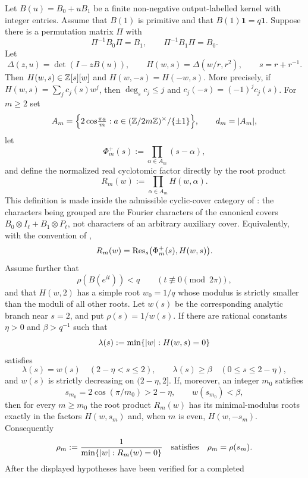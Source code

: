 \begin{theorem}
  \label{thm:self-dual-endpoint-selection}

  Let \(B(u)=B_0+uB_1\) be a finite non-negative output-labelled kernel
  with integer entries. Assume that \(B(1)\) is primitive and that
  \(B(1)\mathbf 1=q\mathbf 1\). Suppose there is a permutation matrix
  \(\Pi\) with
  \[
    \Pi^{-1}B_0\Pi=B_1,\qquad
    \Pi^{-1}B_1\Pi=B_0.
  \]
  Let
  \[
    \Delta(z,u)=\det(I-zB(u)),\qquad
    H(w,s)=\Delta(w/r,r^2),\qquad s=r+r^{-1}.
  \]
  Then \(H(w,s)\in\mathbb{Z}[s][w]\) and \(H(w,-s)=H(-w,s)\). More precisely,
  if \(H(w,s)=\sum_j c_j(s)w^j\), then \(\deg_s c_j\le j\) and
  \(c_j(-s)=(-1)^jc_j(s)\).
  For \(m\ge2\)
  set
  \[
    A_m=\Bigl\{2\cos\!\tfrac{\pi a}{m}:
      a\in(\mathbb{Z}/2m\mathbb{Z})^\times/\{\pm1\}\Bigr\},
      \qquad d_m=|A_m|,
  \]
  let
  \[
    \Phi_m^+(s):=\prod_{\alpha\in A_m}(s-\alpha),
  \]
  and define the normalized real cyclotomic factor directly by the root
  product
  \[
    R_m(w):=\prod_{\alpha\in A_m}H(w,\alpha).
  \]
  This definition is made inside the admissible cyclic-cover category of
  : the characters being grouped are
  the Fourier characters of the canonical covers
  \(B_0\otimes I_\ell+B_1\otimes P_\ell\), not characters of an arbitrary
  auxiliary cover.
  Equivalently, with the convention of
  ,
  \[
    R_m(w)=\operatorname{Res}_s\bigl(\Phi_m^+(s),H(w,s)\bigr).
  \]
  Assume further that
  \[
    \rho(B(e^{it}))<q
    \qquad (t\not\equiv0\pmod{2\pi}),
  \]
  and that \(H(w,2)\) has a simple root \(w_0=1/q\) whose modulus is
  strictly smaller than the moduli of all other roots. Let
  \(w(s)\) be the corresponding analytic branch near \(s=2\), and put
  \(\rho(s)=1/w(s)\). If there are rational constants
  \(\eta>0\) and \(\beta>q^{-1}\) such that
  \[
    \lambda(s):=\min\{\lvert w \rvert:H(w,s)=0\}
  \]
  satisfies
  \[
    \lambda(s)=w(s)
       \quad (2-\eta<s\le2),
    \qquad
    \lambda(s)\ge \beta
       \quad (0\le s\le 2-\eta),
  \]
  and \(w(s)\) is strictly decreasing on \((2-\eta,2]\). If, moreover,
  an integer \(m_0\) satisfies
  \[
    s_{m_0}=2\cos(\pi/m_0)>2-\eta,
    \qquad
    w(s_{m_0})<\beta,
  \]
  then for every \(m\ge m_0\) the root product \(R_m(w)\) has
  its minimal-modulus roots exactly in the factors \(H(w,s_m)\) and,
  when \(m\) is even, \(H(w,-s_m)\). Consequently
  \[
    \rho_m:=\frac{1}{\min\{\lvert w \rvert:R_m(w)=0\}}
    \quad\text{satisfies}\quad
    \rho_m=\rho(s_m).
  \]
  After the displayed hypotheses have been verified for a completed

\end{theorem}
